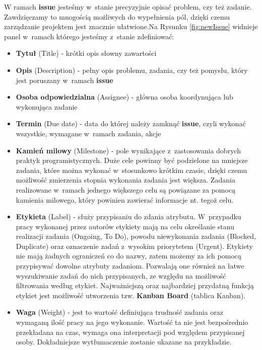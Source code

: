 W ramach \textbf{issue} jesteśmy w~stanie precyzyjnie opisać problem, czy też zadanie. Zawdzięczamy to mnogością możliwych do wypełnienia pól, dzięki czemu zarządzanie projektem jest znacznie ułatwione.Na Rysunku \ref{fig:newIssue} widnieje panel w~ramach którego jesteśmy z~stanie zdefiniować:
\begin{itemize}
\item \textbf{Tytuł} (Title) - krótki opis słowny zawartości
\item \textbf{Opis} (Description) - pełny opis problemu, zadania, czy też pomysłu, który jest poruszany w~ramach \textbf{issue}
\item \textbf{Osoba odpowiedzialna} (Assignee) - główna osoba koordynująca lub wykonująca zadanie
\item \textbf{Termin} (Due date) - data do której należy zamknąć \textbf{issue}, czyli wykonać wszystkie, wymagane w~ramach zadania, akcje
\item \textbf{Kamień milowy} (Milestone) - pole wynikające z~zastosowania dobrych praktyk programistycznych. Duże cele powinny być podzielone na mniejsze zadania, które można wykonać w~stosunkowo krótkim czasie, dzięki czemu możliwość zmierzenia stopnia wykonania zadania jest większa. Zadania realizowane w~ramach jednego większego celu są powiązane za pomocą kamienia milowego, który powinien zawierać informacje nt. tegoż celu.
\item \textbf{Etykieta} (Label) - służy przypisaniu do zdania atrybutu. W~przypadku pracy wykonanej przez autorów etykiety mają na celu określanie stanu realizacji zadania (Ongoing, To Do), powodu niewykonania zadania (Blocked, Duplicate) oraz oznaczenie zadań z~wysokim priorytetem (Urgent). Etykiety nie mają żadnych ograniczeń co do nazwy, zatem możemy za ich pomocą przypisywać dowolne atrybuty zadaniom. Pozwalają one również na łatwe wyszukiwanie zadań do nich przypisanych, ze względu na możliwość filtrowania według etykiet. Najważniejszą oraz najbardziej przydatną funkcją etykiet jest możliwość utworzenia tzw. \textbf{Kanban Board} (tablica Kanban).
\item \textbf{Waga} (Weight) - jest to wartość definiująca trudność zadania oraz wymaganą ilość pracy na jego wykonanie. Wartość ta nie jest bezpośrednio przekładana na czas, wymaga ona interpretacji pod względem przypisanej osoby. Dokładniejsze wytłumaczenie zostanie ukazane na przykładzie.
\end{itemize}

